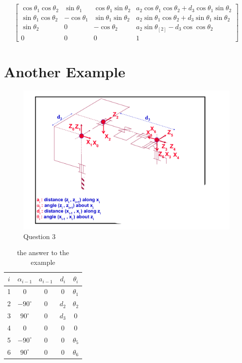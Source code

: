 \documentclass{article}
\begin{document}
\begin{enumerate}
\begin{align*}
\begin{bmatrix}
                \cos{\theta_{1}}\cos{\theta_{2}} & \sin{\theta_{1}} & \cos{\theta_{1}}\sin{\theta_{2}} & a_{2}\cos{\theta_{1}}\cos{\theta_{2}} + d_{3}\cos{\theta_{1}}\sin{\theta_{2}} \\
                \sin{\theta_{1}}\cos{\theta_{2}} & -\cos{\theta_{1}} & \sin{\theta_{1}}\sin{\theta_{2}} &  a_{2}\sin{\theta_{1}}\cos{\theta_{2}} + d_{3}\sin{\theta_{1}}\sin{\theta_2} \\
                \sin{\theta_{2}} & 0 & -\cos{\theta_{2}} & a_{2}\sin{\theta_[2]} - d_{3}\cos{\cos{\theta_{2}}} \\
                0 & 0 & 0 & 1
            \end{bmatrix}
        \end{align*}
\end{enumerate}

\section*{Another Example}
\begin{figure}[H]
    \centering
    \includegraphics[width=0.5\linewidth]{picture/Example.png}
    \caption{Question 3}
    \label{fig:placeholder}
\end{figure}

\begin{table}[H]
\centering
\begin{tabular}{|c|c|c|c|c|}
\hline
$i$ & $\alpha_{i-1}$ & $a_{i-1}$ & $d_{i}$ & $\theta_{i}$ \\ \hline
1  & 0  & 0  & 0  & $\theta_{1}$  \\ \hline
2  & $-90^\circ$  & 0  & $d_{2}$  & $\theta_{2}$  \\ \hline
3  & $90^\circ$  & 0  & $d_{3}$  & 0  \\ \hline
4  & 0 & 0 & 0  & 0  \\ \hline
5  & $-90^\circ$  & 0  & 0 & $\theta_{5}$  \\ \hline
6  & $90^\circ$  & 0  & 0  & $\theta_{6}$ \\ \hline
\end{tabular}
\caption{the answer to the example}
\label{tab:mytable}
\end{table}
\end{document}
